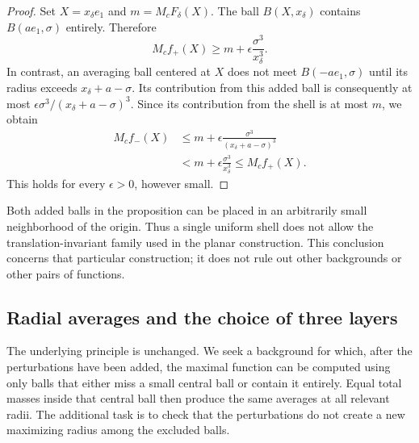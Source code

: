 \documentclass[12pt]{amsart}
\numberwithin{equation}{section}
\begin{document}
\begin{proof}
Set $X=x_\delta e_1$ and $m=M_cF_\delta(X)$. The ball
$B(X,x_\delta)$ contains $B(ae_1,\sigma)$ entirely. Therefore
\[
M_cf_+(X)\geq m+\epsilon\frac{\sigma^3}{x_\delta^3}.
\]
In contrast, an averaging ball centered at $X$ does not meet
$B(-ae_1,\sigma)$ until its radius exceeds $x_\delta+a-\sigma$.
Its contribution from this added ball is consequently at most
$\epsilon\sigma^3/(x_\delta+a-\sigma)^3$. Since its contribution
from the shell is at most $m$, we obtain
\begin{equation}
\label{three_dimensional_moving_ball_obstruction}
\begin{aligned}
M_cf_-(X)
&\leq m+\epsilon\frac{\sigma^3}{(x_\delta+a-\sigma)^3}\\
&<m+\epsilon\frac{\sigma^3}{x_\delta^3}
\leq M_cf_+(X).
\end{aligned}
\end{equation}
This holds for every $\epsilon>0$, however small.
\end{proof}

Both added balls in the proposition can be placed in an arbitrarily
small neighborhood of the origin. Thus a single uniform shell does
not allow the translation-invariant family used in the planar
construction. This conclusion concerns that particular construction;
it does not rule out other backgrounds or other pairs of functions.

\subsection{Radial averages and the choice of three layers}

The underlying principle is unchanged. We seek a background for which,
after the perturbations have been added, the maximal function can be
computed using only balls that either miss a small central ball or
contain it entirely. Equal total masses inside that central ball then
produce the same averages at all relevant radii. The additional task
is to check that the perturbations do not create a new maximizing
radius among the excluded balls.
\end{document}

